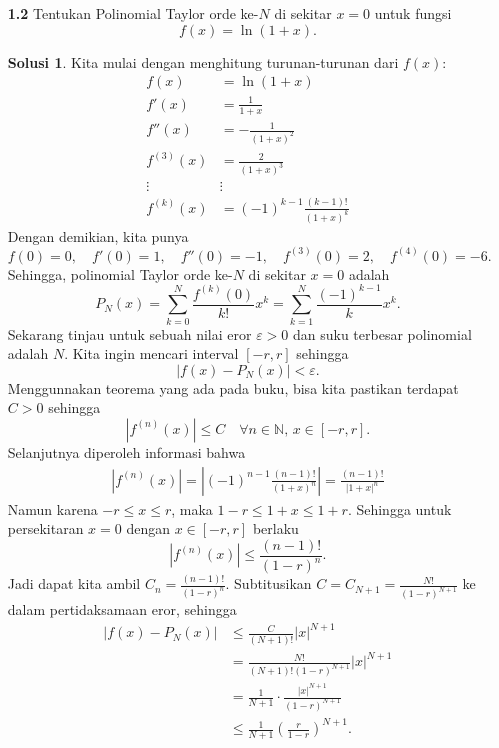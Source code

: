 \documentclass[a4paper]{article}
\theoremstyle{definition}
\newtheorem*{solusi}{Solusi}
\newcommand{\N}{\mathbb{N}}
\begin{document}
\pagestyle{fancy}
\begin{enumerate}
  \item[\textbf{1.2}] Tentukan Polinomial Taylor orde ke-$N$ di sekitar $x=0$ untuk fungsi
        \[f(x) = \ln(1+x).\]
        \begin{solusi}
          Kita mulai dengan menghitung turunan-turunan dari $f(x)$:
          \begin{align*}
            f(x)       & = \ln(1+x)                         \\
            f'(x)      & = \frac{1}{1+x}                    \\
            f''(x)     & = -\frac{1}{(1+x)^2}               \\
            f^{(3)}(x) & = \frac{2}{(1+x)^3}                \\
            \vdots     & \vdots                             \\
            f^{(k)}(x) & = (-1)^{k-1}\frac{(k-1)!}{(1+x)^k}
          \end{align*}
          Dengan demikian, kita punya
          \[
            f(0) = 0, \quad f'(0) = 1, \quad f''(0) = -1, \quad f^{(3)}(0) = 2, \quad f^{(4)}(0) = -6.
          \]
          Sehingga, polinomial Taylor orde ke-$N$ di sekitar $x=0$ adalah
          \[
            P_N(x) = \sum_{k=0}^{N} \frac{f^{(k)}(0)}{k!} x^k= \sum_{k=1}^{N} \frac{(-1)^{k-1}}{k} x^k.
          \]
          Sekarang tinjau untuk sebuah nilai eror $\varepsilon > 0$ dan suku terbesar polinomial adalah $N$. Kita ingin mencari interval $[-r,r]$ sehingga
          \[
            |f(x) - P_N(x)| < \varepsilon.
          \]
          Menggunnakan teorema yang ada pada buku, bisa kita pastikan terdapat $C>0$ sehingga
          \[
            |f^{(n)}(x)| \leq C \quad \forall n\in\N,\, x \in [-r,r].
          \]
          Selanjutnya diperoleh informasi bahwa
          \begin{align*}
            |f^{(n)}(x)|  = \left|(-1)^{n-1}\frac{(n-1)!}{(1+x)^n}\right|= \frac{(n-1)!}{|1+x|^n}
          \end{align*}
          Namun karena $-r\leq x \leq r$, maka $1-r \leq 1+x \leq 1+r$. Sehingga untuk persekitaran $x=0$ dengan $x \in [-r,r]$ berlaku
          \[
            |f^{(n)}(x)| \leq \frac{(n-1)!}{(1-r)^n}.
          \]
          Jadi dapat kita ambil $C_n = \frac{(n-1)!}{(1-r)^n}$. Subtitusikan $C=C_{N+1} = \frac{N!}{(1-r)^{N+1}}$ ke dalam pertidaksamaan eror, sehingga
          \begin{align*}
            |f(x) - P_N(x)| & \leq \frac{C}{(N+1)!}|x|^{N+1}                      \\
                            & = \frac{N!}{(N+1)!(1-r)^{N+1}}|x|^{N+1}             \\
                            & = \frac{1}{N+1}\cdot\frac{|x|^{N+1}}{ (1-r)^{N+1}}  \\
                            & \leq \frac{1}{N+1}\left(\frac{r}{1-r}\right)^{N+1}.
          \end{align*}


\end{solusi}
\end{enumerate}
\end{document}
